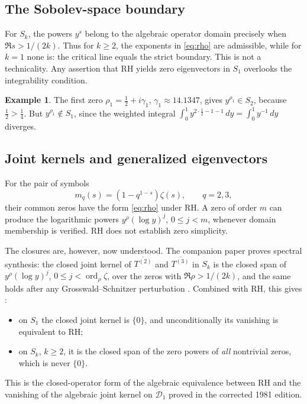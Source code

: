 \documentclass[12pt,letterpaper]{article}
\numberwithin{equation}{section}
\theoremstyle{definition}
\newtheorem{example}{Example}[section]
\begin{document}
\subsection{The Sobolev-space boundary}
For $S_k$, the powers $y^s$ belong to the algebraic operator
domain precisely when $\Re s>1/(2k)$. Thus for $k\ge2$,
the exponents in \eqref{eq:rho} are admissible, while for $k=1$
none is: the critical line equals the strict boundary.
This is not a technicality. Any assertion that RH yields
zero eigenvectors in $S_1$ overlooks the integrability condition.

\begin{example}
The first zero $\rho_1=\tfrac12+i\gamma_1$, $\gamma_1\approx14.1347$, gives
$y^{\rho_1}\in S_2$, because $\tfrac12>\tfrac14$.  But $y^{\rho_1}\notin S_1$,
since the weighted integral $\int_0^1y^{2\cdot\frac12-1-1}\,dy=\int_0^1y^{-1}\,dy$
diverges.
\end{example}

\subsection{Joint kernels and generalized eigenvectors}
For the pair of symbols
\begin{equation}\label{eq:pair}
m_q(s)=(1-q^{1-s})\zeta(s),\qquad q=2,3,
\end{equation}
their common zeros have the form \eqref{eq:rho} under RH.
A zero of order $m$ can produce the logarithmic powers
$y^\rho(\log y)^j$, $0\le j<m$, whenever domain membership
is verified. RH does not establish zero simplicity.

The closures are, however, now understood.  The companion paper
\cite{GS26} proves spectral synthesis: the closed joint kernel of
$\overline{T^{(2)}}$ and $\overline{T^{(3)}}$ in $S_k$ is the closed span of
$y^\rho(\log y)^j$, $0\le j<\operatorname{ord}_\rho\zeta$, over the zeros with
$\Re\rho>1/(2k)$, and the same holds after any Grosswald--Schnitzer
perturbation \cite[Theorem~2.1]{GS26}.  Combined with RH, this
gives \cite[Corollary~11.1]{GS26}:
\begin{itemize}
\item on $S_1$ the closed joint kernel is $\{0\}$, and unconditionally its
  vanishing is equivalent to RH;
\item on $S_k$, $k\ge2$, it is the closed span of the zero powers of
  \emph{all} nontrivial zeros, which is never $\{0\}$.
\end{itemize}
This is the closed-operator form of the algebraic equivalence between
RH and the vanishing of the algebraic joint kernel on $\mathcal D_1$ proved
in the corrected 1981 edition.
\end{document}
